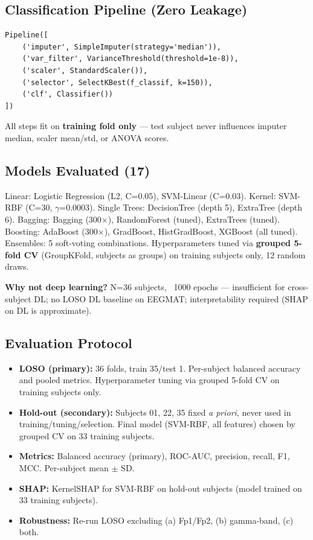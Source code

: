 \documentclass[conference]{IEEEtran}
\begin{document}
\subsection{Classification Pipeline (Zero Leakage)}
\label{sec:pipeline}
\begin{verbatim}
Pipeline([
    ('imputer', SimpleImputer(strategy='median')),
    ('var_filter', VarianceThreshold(threshold=1e-8)),
    ('scaler', StandardScaler()),
    ('selector', SelectKBest(f_classif, k=150)),
    ('clf', Classifier())
])
\end{verbatim}
All steps fit on \textbf{training fold only} — test subject never influences imputer median, scaler mean/std, or ANOVA scores.

\subsection{Models Evaluated (17)}
\label{sec:models}
Linear: Logistic Regression (L2, C=0.05), SVM-Linear (C=0.03). Kernel: SVM-RBF (C=30, $\gamma$=0.0003). Single Trees: DecisionTree (depth 5), ExtraTree (depth 6). Bagging: Bagging (300$\times$), RandomForest (tuned), ExtraTrees (tuned). Boosting: AdaBoost (300$\times$), GradBoost, HistGradBoost, XGBoost (all tuned). Ensembles: 5 soft-voting combinations. Hyperparameters tuned via \textbf{grouped 5-fold CV} (GroupKFold, subjects as groups) on training subjects only, 12 random draws.

\textbf{Why not deep learning?} N=36 subjects, ~1000 epochs — insufficient for cross-subject DL; no LOSO DL baseline on EEGMAT; interpretability required (SHAP on DL is approximate).

\subsection{Evaluation Protocol}
\label{sec:eval}
\begin{itemize}
    \item \textbf{LOSO (primary):} 36 folds, train 35/test 1. Per-subject balanced accuracy and pooled metrics. Hyperparameter tuning via grouped 5-fold CV on training subjects only.
    \item \textbf{Hold-out (secondary):} Subjects 01, 22, 35 fixed \textit{a priori}, never used in training/tuning/selection. Final model (SVM-RBF, all features) chosen by grouped CV on 33 training subjects.
    \item \textbf{Metrics:} Balanced accuracy (primary), ROC-AUC, precision, recall, F1, MCC. Per-subject mean $\pm$ SD.
    \item \textbf{SHAP:} KernelSHAP for SVM-RBF on hold-out subjects (model trained on 33 training subjects).
    \item \textbf{Robustness:} Re-run LOSO excluding (a) Fp1/Fp2, (b) gamma-band, (c) both.
\end{itemize}
\end{document}
